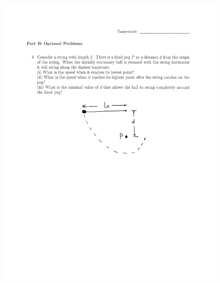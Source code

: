 \documentclass[10pt,a4paper]{article}
\begin{document}
\begin{figure}[H]
 \centering
 \includegraphics[width=16cm]{pdf/1-1T53.png}
\end{figure}
 \newpage
\end{document}
